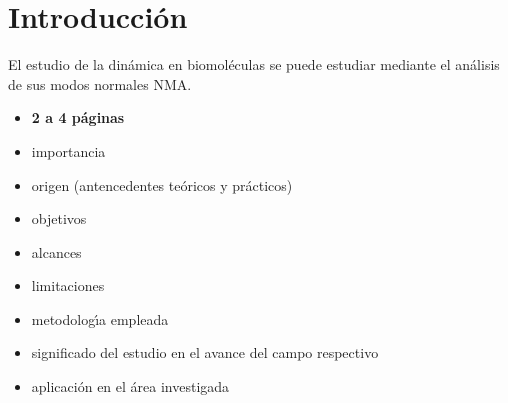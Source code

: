 \chapter*{Introducci\'{o}n}
El estudio de la din\'{a}mica en biomol\'{e}culas se puede estudiar mediante el análisis de sus modos normales NMA.
\begin{itemize}
\item \textbf{2 a 4 p\'{a}ginas}
\item importancia
\item origen (antencedentes te\'{o}ricos y pr\'{a}cticos)
\item objetivos
\item alcances
\item limitaciones
\item metodolog\'{\i}a empleada
\item significado del estudio en el avance del campo respectivo
\item aplicaci\'{o}n en el \'{a}rea investigada
\end{itemize}
